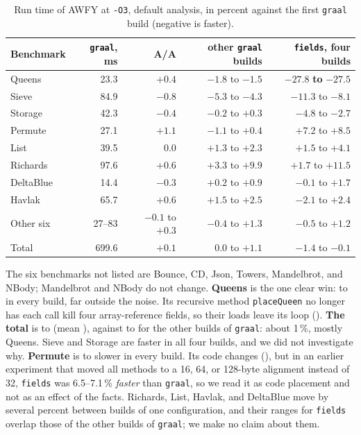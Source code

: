 \begin{table}[t]
    \centering
    \caption{Run time of AWFY at \texttt{-O3}, default analysis, in percent against the first \texttt{graal} build (negative is faster).}
    \label{tab:eval-time}
    \footnotesize
    \begin{tabular}{lrrrr}
        \toprule
        Benchmark & \texttt{graal}, ms & A/A & other \texttt{graal} builds & \texttt{fields}, four builds \\
        \midrule
        Queens      & 23.3  & $+0.4$ & $-1.8$ to $-1.5$ & $\mathbf{-27.8}$ \textbf{to} $\mathbf{-27.5}$ \\
        Sieve       & 84.9  & $-0.8$ & $-5.3$ to $-4.3$ & $-11.3$ to $-8.1$ \\
        Storage     & 42.3  & $-0.4$ & $-0.2$ to $+0.3$ & $-4.8$ to $-2.7$ \\
        Permute     & 27.1  & $+1.1$ & $-1.1$ to $+0.4$ & $+7.2$ to $+8.5$ \\
        List        & 39.5  & $0.0$  & $+1.3$ to $+2.3$ & $+1.5$ to $+4.1$ \\
        Richards    & 97.6  & $+0.6$ & $+3.3$ to $+9.9$ & $+1.7$ to $+11.5$ \\
        DeltaBlue   & 14.4  & $-0.3$ & $+0.2$ to $+0.9$ & $-0.1$ to $+1.7$ \\
        Havlak      & 65.7  & $+0.6$ & $+1.5$ to $+2.5$ & $-2.1$ to $+2.4$ \\
        Other six   & 27--83 & $-0.1$ to $+0.3$ & $-0.4$ to $+1.3$ & $-0.5$ to $+1.2$ \\
        \midrule
        Total       & 699.6 & $+0.1$ & $0.0$ to $+1.1$ & $-1.4$ to $-0.1$ \\
        \bottomrule
    \end{tabular}
\end{table}

The six benchmarks not listed are Bounce, CD, Json, Towers, Mandelbrot, and NBody; Mandelbrot and NBody do not change.
\textbf{Queens} is the one clear win:  to  in every build, far outside the noise. Its recursive method
\texttt{placeQueen} no longer has each call kill four array-reference fields, so their loads leave its loop
(). \textbf{The total} is  to  (mean ), against  to  for
the other builds of \texttt{graal}: about 1\,\%, mostly Queens. Sieve and Storage are faster in all four builds, and we did not
investigate why. \textbf{Permute} is  to  slower in every build. Its code changes (), but
in an earlier experiment that moved all methods to a 16, 64, or 128-byte alignment instead of 32, \texttt{fields} was 6.5--7.1\,\%
\emph{faster} than \texttt{graal}, so we read it as code placement and not as an effect of the facts. Richards, List, Havlak, and
DeltaBlue move by several percent between builds of one configuration, and their ranges for \texttt{fields} overlap those of the
other builds of \texttt{graal}; we make no claim about them.

